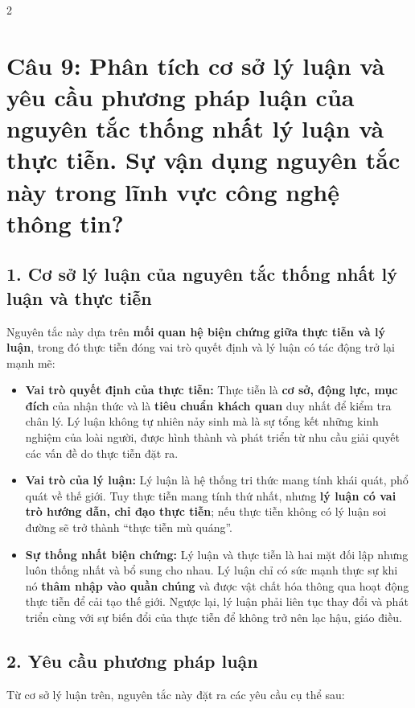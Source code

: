 \documentclass[9pt,a4paper]{extarticle}
\begin{document}
\begin{multicols*}{2}
\section*{Câu 9: Phân tích cơ sở lý luận và yêu cầu phương pháp luận của nguyên tắc thống nhất lý luận và thực tiễn. Sự vận dụng nguyên tắc này trong lĩnh vực công nghệ thông tin?}

\subsection*{1. Cơ sở lý luận của nguyên tắc thống nhất lý luận và thực tiễn}

Nguyên tắc này dựa trên \textbf{mối quan hệ biện chứng giữa thực tiễn và lý luận}, trong đó thực tiễn đóng vai trò quyết định và lý luận có tác động trở lại mạnh mẽ:

\begin{itemize}
\item \textbf{Vai trò quyết định của thực tiễn:} Thực tiễn là \textbf{cơ sở, động lực, mục đích} của nhận thức và là \textbf{tiêu chuẩn khách quan} duy nhất để kiểm tra chân lý. Lý luận không tự nhiên nảy sinh mà là sự tổng kết những kinh nghiệm của loài người, được hình thành và phát triển từ nhu cầu giải quyết các vấn đề do thực tiễn đặt ra.
\item \textbf{Vai trò của lý luận:} Lý luận là hệ thống tri thức mang tính khái quát, phổ quát về thế giới. Tuy thực tiễn mang tính thứ nhất, nhưng \textbf{lý luận có vai trò hướng dẫn, chỉ đạo thực tiễn}; nếu thực tiễn không có lý luận soi đường sẽ trở thành ``thực tiễn mù quáng''.
\item \textbf{Sự thống nhất biện chứng:} Lý luận và thực tiễn là hai mặt đối lập nhưng luôn thống nhất và bổ sung cho nhau. Lý luận chỉ có sức mạnh thực sự khi nó \textbf{thâm nhập vào quần chúng} và được vật chất hóa thông qua hoạt động thực tiễn để cải tạo thế giới. Ngược lại, lý luận phải liên tục thay đổi và phát triển cùng với sự biến đổi của thực tiễn để không trở nên lạc hậu, giáo điều.
\end{itemize}

\subsection*{2. Yêu cầu phương pháp luận}

Từ cơ sở lý luận trên, nguyên tắc này đặt ra các yêu cầu cụ thể sau:


\end{multicols*}
\end{document}
